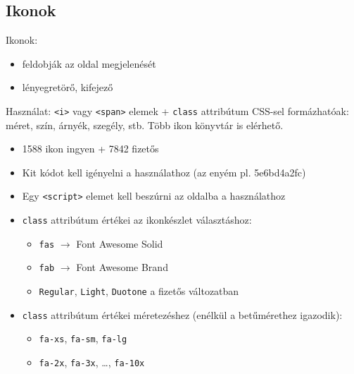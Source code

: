 \subsection{Ikonok}

\begin{frame}
  Ikonok:
  \begin{itemize}
    \item feldobják az oldal megjelenését
    \item lényegretörő, kifejező
  \end{itemize}
  \vfill
  Használat: \texttt{<i>} vagy \texttt{<span>} elemek + \texttt{class} attribútum
  \vfill
  CSS-sel formázhatóak: méret, szín, árnyék, szegély, stb.
  \vfill
  Több ikon könyvtár is elérhető.
\end{frame}

\begin{frame}
  \begin{itemize}
    \item 1588 ikon ingyen + 7842 fizetős
    \item Kit kódot kell igényelni a használathoz (az enyém pl. 5e6bd4a2fc)
    \item Egy \texttt{<script>} elemet kell beszúrni az oldalba a használathoz
    \item \texttt{class} attribútum értékei az ikonkészlet választáshoz:
    \begin{itemize}
      \item \texttt{fas} $\to$ Font Awesome Solid
      \item \texttt{fab} $\to$ Font Awesome Brand
      \item \texttt{Regular}, \texttt{Light}, \texttt{Duotone} a fizetős változatban
    \end{itemize}
    \item \texttt{class} attribútum értékei méretezéshez (enélkül a betűmérethez igazodik):
    \begin{itemize}
      \item \texttt{fa-xs}, \texttt{fa-sm}, \texttt{fa-lg}
      \item \texttt{fa-2x}, \texttt{fa-3x}, \dots, \texttt{fa-10x}
    \end{itemize}
  \end{itemize}
\end{frame}

